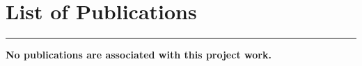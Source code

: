 \chapter*{List of Publications}
\label{publications}

\noindent\rule{\linewidth}{2pt}

\begin{center}
\textbf{No publications are associated with this project work.}
\end{center}

